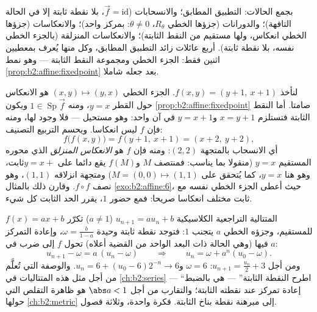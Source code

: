 \begin{remark}
بجمع الحالات: التطبيق المطابق؛ والانسحابات ($\vec f =
\mathrm{id}$، بلا نقطة ثابتة
إلا في الحالة التافهة)؛ والدورانات (جزؤها الخطي $R_\theta$، $\theta \neq 0$: بمركز
واحد)؛ والانعكاسات (جزؤها الخطي انعكاس، ولها مستقيم من النقط
الثابتة)؛ والانعكاسات المنزلقة (بالجزء الخطي نفسه، بلا نقطة ثابتة).
أربع عائلات زائد التطبيق المطابق، وكل منها يُعرف بمعطيين اثنين فقط:
الجزء الخطي ومجموعة النقط الثابتة --- وهو نمط \cref{prop:b2:affine:fixedpoint} بعد جعله
شاملا.
\end{remark}

\begin{example}\label{ex:b2:affine:glide}
لنأخذ $f(x, y) = (y + 1,\ x + 1)$. الجزء الخطي $(x, y)
\mapsto (y, x)$ هو الانعكاس حول القطر $y = x$،
ومنه $1 \in \operatorname{Sp}\vec f$ ويكون \cref{prop:b2:affine:fixedpoint} صامتا. أما النقط الثابتة فتستلزم $x = y + 1$
و$y = x + 1$ في آن واحد: وهو مستحيل --- فلا وجود لها، ومنه فإن $f$
ليس انعكاسا. ويحسم التربيع التصنيف:
\[
f\bigl(f(x, y)\bigr) = f(y + 1,\ x + 1) = (x + 2,\ y + 2),
\]
أي الانسحاب بالمتجهة $(2, 2)$: ومنه فإن $f$ هو \emph{الانعكاس
المنزلق} الذي محوره المستقيم $y = x$ (منقولا بما يناسب: فمنتصف $M$
و$f(M)$ يقع دائما على $y = x + {}$ثابت، وهو هنا $y = x$، كما يُتحقق على
$M = (0,
0) \mapsto (1,1)$) ومتجهة انزلاقه $(1, 1)$، وهو نصف $f
\circ f$. وقارن ذلك بالمثال
\cref{exo:b2:affine:6}، حيث أعطى الجزء الخطي نفسه مع ثابت مختلف انعكاسا صريحا: فمع
حضور  $1$، يقرر الحد الثابت كل شيء.
\end{example}

\begin{example}\label{ex:b2:affine:recursion}
المتتالية التراجعية الكلاسيكية $u_{n+1} = au_n + b$ ($a \neq 1$) تكرّر  $f(x) = ax + b$ للمستقيم، وجزؤه الخطي $a$ يتجنب 
$1$: فتوجد نقطة ثابتة وحيدة $\omega = \frac{b}{1-a}$، وإعادة التمركز فيها (وهي
الحالة ذات البعد الواحد من القضية أعلاه) تحول $f$ إلى ضرب في
$a$:
\[
u_{n+1} - \omega = a\,(u_n - \omega)
\qquad\Longrightarrow\qquad
u_n = \omega + a^n(u_0 - \omega) .
\]
ومن أجل $u_{n+1} = \frac{u_n}2 + 3$: $\omega = 6$ و$u_n = 6 +
(u_0 - 6)2^{-n} \to 6$. والوصفة التي تُعلَّم من أجل مثل هذه
المتتاليات في \cref{ch:b2:series} --- ``اطرح النقطة الثابتة'' --- هي بالضبط
إعادة تمركز  عند نقطته الثابتة؛ والتقارب من أجل $\abs a < 1$ هو ظاهرة
التقلص التي حولها \cref{ch:b2:metric} إلى مبرهنة نقطة بناخ الثابتة. فكرة واحدة،
وثلاثة فصول.
\end{example}

